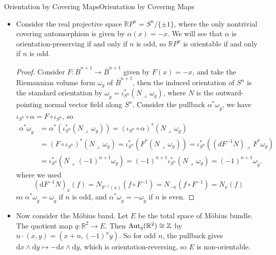 \documentclass[../main.tex]{subfiles}
\begin{document}
\begin{example}{Orientation by Covering Maps}{Orientation by Covering Maps}
  \begin{itemize}
    \item Consider the real projective space $\mathbb{R}P^n = S^n/\{\pm 1\}$, where the only nontrivial covering automorphism is given by $\alpha(x) = -x$. We will see that $\alpha$ is orientation-preserving if and only if $n$ is odd, so $\mathbb{R}P^n$ is orientable if and only if $n$ is odd.
    \begin{proof}
      Consider $F: \overline{B}^{n+1} \to \overline{B}^{n+1}$ given by $F(x) = -x$, and take the Riemannian volume form $\omega_g$ of $\overline{B}^{n+1}$, then the induced orientation of $S^n$ is the standard orientation by $\omega_{\tilde{g}} = \iota_{S^n}^* (N \lrcorner \, \omega_g)$, where $N$ is the outward-pointing normal vector field along $S^n$. Consider the pullback $\alpha^* \omega_{\tilde{g}}$, we have $\iota_{S^n} \circ \alpha = F \circ \iota_{S^n}$, so
      \begin{equation*}
        \begin{aligned}
          \alpha^* \omega_{\tilde{g}} & = \alpha^* (\iota_{S^n}^* (N \lrcorner \, \omega_g)) = (\iota_{S^n} \circ \alpha)^* (N \lrcorner \, \omega_g)\\
          & = (F \circ \iota_{S^n})^* (N \lrcorner \, \omega_g) = \iota_{S^n}^* (F^* (N \lrcorner \, \omega_g)) = \iota_{S^n}^* ((dF^{-1} N) \lrcorner \, F^* \omega_g)\\
          & = \iota_{S^n}^* (N \lrcorner \, (-1)^{n+1} \omega_g) = (-1)^{n+1} \iota_{S^n}^* (N \lrcorner \, \omega_g) = (-1)^{n+1} \omega_{\tilde{g}}.
        \end{aligned}
      \end{equation*}
      where we used
      \begin{equation*}
        (\mathrm{d} F^{-1} N)_x(f) = N_{F^{-1}(x)}(f \circ F^{-1}) = N_{-x}(f \circ F^{-1}) = N_x(f)
      \end{equation*}
      so $\alpha^* \omega_{\tilde{g}} = \omega_{\tilde{g}}$ if $n$ is odd, and $\alpha^* \omega_{\tilde{g}} = -\omega_{\tilde{g}}$ if $n$ is even.
    \end{proof}

  \item Now consider the M\"obius band. Let $E$ be the total space of M\"obius bundle. The quotient map $q: \mathbb{R}^2 \to E$. Then $\operatorname{Aut}_q(\mathbb{R}^2) \cong \mathbb{Z}$ by $n \cdot (x,y) = (x + n, (-1)^n y)$. So for odd $n$, the pullback gives $ \mathrm{d} x \wedge \mathrm{d} y \mapsto - \mathrm{d} x \wedge \mathrm{d} y$, which is orientation-reversing, so $E$ is non-orientable.
  \end{itemize}
\end{example}
\end{document}
